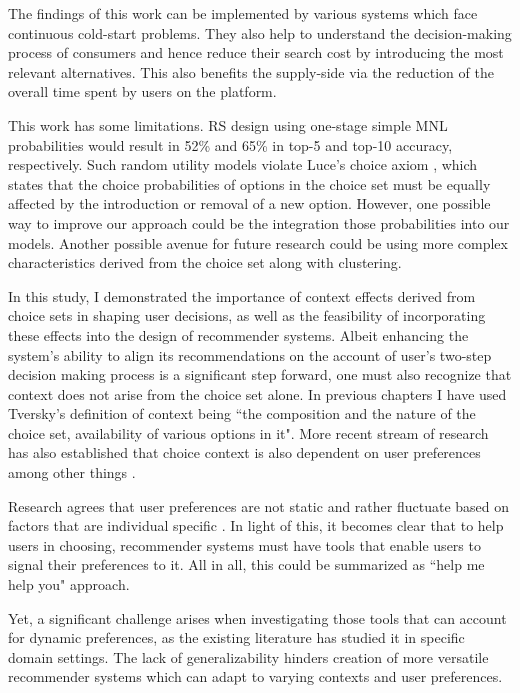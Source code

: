 \documentclass[a4paper,12pt]{article}
\newcommand{\citeyearonly}[1]{\citeyearpar{#1}}
\begin{document}
The findings of this work can be implemented by various systems which face continuous cold-start problems. They also help to understand the decision-making process of consumers and hence reduce their search cost by introducing the most relevant alternatives. This also benefits the supply-side via the reduction of the overall time spent by users on the platform.

This work has some limitations. RS design using one-stage simple MNL probabilities would result in 52\% and 65\% in top-5 and top-10 accuracy, respectively. Such random utility models violate Luce's choice axiom \citep{luce2012individual}, which states that the choice probabilities of options in the choice set must be equally affected by the introduction or removal of a new option. However, one possible way to improve our approach could be the integration those probabilities into our models. Another possible avenue for future research could be using more complex characteristics derived from the choice set along with clustering.


In this study, I demonstrated the importance of context effects derived from choice sets in shaping user decisions, as well as the feasibility of incorporating these effects into the design of recommender systems.
Albeit enhancing the system's ability to align its recommendations on the account of user's two-step decision making process is a significant step forward, one must also recognize that context does not arise from the choice set alone. In previous chapters I have used Tversky's \citeyearonly{tversky1972elimination} definition of context being ``the composition  and the nature of the choice set, availability of various options in it". More recent stream of research has also established that choice context is also dependent on user preferences among other things \citep{adomavicius2011context, dey2001understanding}.

Research agrees that user preferences are not static and rather fluctuate based on factors that are individual specific \citep{songWhenHowDiversify2019}. In light of this, it becomes clear that to help users in choosing, recommender systems must have tools that enable users to signal their preferences to it. All in all, this could be summarized as ``help me help you" approach.

Yet, a significant challenge arises when investigating those tools that can account for dynamic preferences, as the existing literature has studied it in specific domain settings. The lack of generalizability hinders creation of more versatile recommender systems which can adapt to varying contexts and user preferences. 
\end{document}
